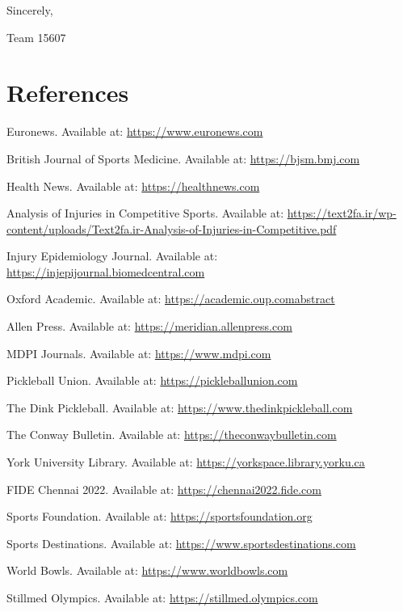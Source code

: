\documentclass[12pt]{article}
\begin{document}
Sincerely,

Team 15607

\section{References}
\begin{thebibliography}{99}

 Euronews. Available at: \url{https://www.euronews.com}

 British Journal of Sports Medicine. Available at: \url{https://bjsm.bmj.com}

 Health News. Available at: \url{https://healthnews.com}

 Analysis of Injuries in Competitive Sports. Available at: \url{https://text2fa.ir/wp-content/uploads/Text2fa.ir-Analysis-of-Injuries-in-Competitive.pdf}

 Injury Epidemiology Journal. Available at: \url{https://injepijournal.biomedcentral.com}

 Oxford Academic. Available at: \url{https://academic.oup.comabstract}

 Allen Press. Available at: \url{https://meridian.allenpress.com}

 MDPI Journals. Available at: \url{https://www.mdpi.com}

 Pickleball Union. Available at: \url{https://pickleballunion.com}

 The Dink Pickleball. Available at: \url{https://www.thedinkpickleball.com}

 The Conway Bulletin. Available at: \url{https://theconwaybulletin.com}

 York University Library. Available at: \url{https://yorkspace.library.yorku.ca}

 FIDE Chennai 2022. Available at: \url{https://chennai2022.fide.com}

 Sports Foundation. Available at: \url{https://sportsfoundation.org}

 Sports Destinations. Available at: \url{https://www.sportsdestinations.com}

 World Bowls. Available at: \url{https://www.worldbowls.com}

 Stillmed Olympics. Available at: \url{https://stillmed.olympics.com}


\end{thebibliography}
\end{document}
